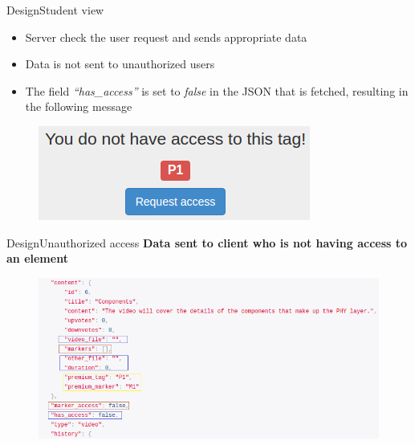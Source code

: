 \documentclass[xcolor=table]{beamer}
\begin{document}
\begin{frame}{Design}{Student view}
	\begin{itemize}
		\item Server check the user request and sends appropriate data
		\item Data is not sent to unauthorized users
		\item The field \textit{``has\_access''} is set to \textit{false} in the JSON that is fetched, resulting in the following message
	\end{itemize}
	\begin{figure}
	\centering
	\includegraphics[width=0.5\linewidth]{./media/ac_no}
	\label{fig:ac_no}
	\end{figure}
\end{frame}

\begin{frame}{Design}{Unauthorized access}
	\textbf{Data sent to client who is not having access to an element}	
	\begin{figure}
	\centering
	\includegraphics[width=1\linewidth]{media/SUgetdata}
	\label{fig:SUgetdata}
	\end{figure}
\end{frame}
\end{document}
